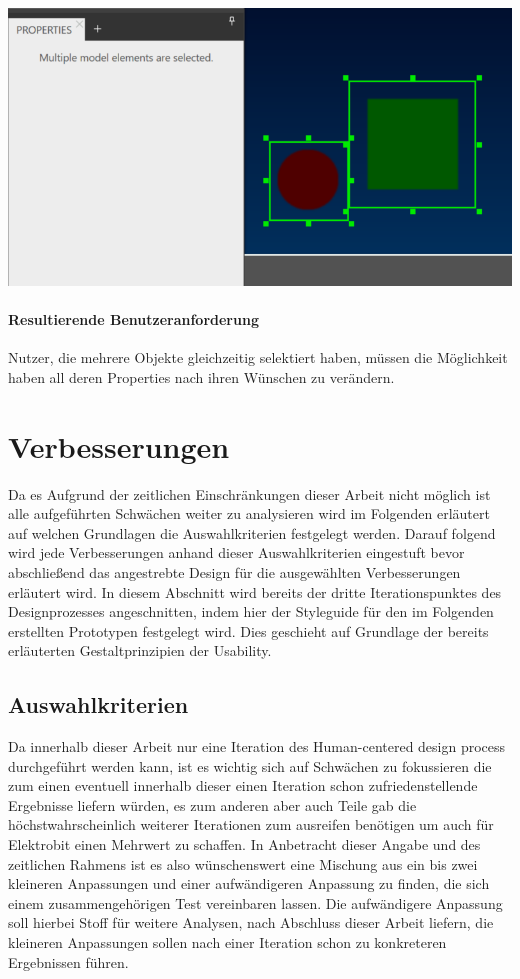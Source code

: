 \begin{center}
  \includegraphics[scale=0.8]{figures/Mehrfachselektion.png}
  \label{fig:Mehrfachselektion}
\end{center}

\paragraph{Resultierende Benutzeranforderung}
Nutzer, die mehrere Objekte gleichzeitig selektiert haben, müssen die Möglichkeit haben all deren Properties nach ihren Wünschen zu verändern.

\section{Verbesserungen}
Da es Aufgrund der zeitlichen Einschränkungen dieser Arbeit nicht möglich ist alle aufgeführten Schwächen weiter zu analysieren wird im Folgenden erläutert auf welchen Grundlagen die Auswahlkriterien festgelegt werden.
Darauf folgend wird jede Verbesserungen anhand dieser Auswahlkriterien eingestuft bevor abschließend das angestrebte Design für die ausgewählten Verbesserungen erläutert wird.
In diesem Abschnitt wird bereits der dritte Iterationspunktes des Designprozesses angeschnitten, indem hier der Styleguide für den im Folgenden erstellten Prototypen festgelegt wird. Dies geschieht auf Grundlage der bereits erläuterten Gestaltprinzipien der Usability.

\subsection{Auswahlkriterien}
Da innerhalb dieser Arbeit nur eine Iteration des Human-centered design process durchgeführt werden kann, ist es wichtig sich auf Schwächen zu fokussieren die zum einen eventuell innerhalb dieser einen Iteration schon zufriedenstellende Ergebnisse liefern würden, es zum anderen aber auch Teile gab die höchstwahrscheinlich weiterer Iterationen zum ausreifen benötigen um auch für Elektrobit einen Mehrwert zu schaffen.
In Anbetracht dieser Angabe und des zeitlichen Rahmens ist es also wünschenswert eine Mischung aus ein bis zwei kleineren Anpassungen und einer aufwändigeren Anpassung zu finden, die sich einem zusammengehörigen Test vereinbaren lassen.
Die aufwändigere Anpassung soll hierbei Stoff für weitere Analysen, nach Abschluss dieser Arbeit liefern, die kleineren Anpassungen sollen nach einer Iteration schon zu konkreteren Ergebnissen führen.

